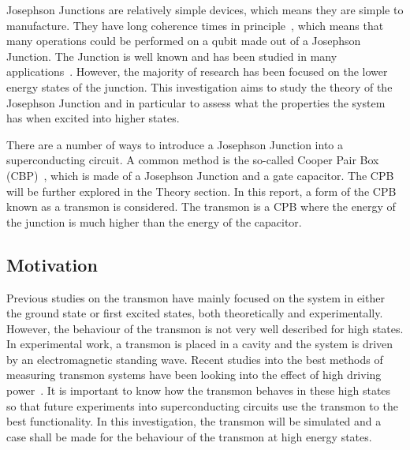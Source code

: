 \documentclass[11pt]{article}
\begin{document}
Josephson Junctions are relatively simple devices, which means they are simple to manufacture. They have long coherence times in principle~\cite{paikObservationHighCoherence2011}, which means that many operations could be performed on a qubit made out of a Josephson Junction. The Junction is well known and has been studied in many applications~\cite{yuCoherentTemporalOscillations2002,simmondsDecoherenceJosephsonPhase2004}. However, the majority of research has been focused on the lower energy states of the junction. This investigation aims to study the theory of the Josephson Junction and in particular to assess what the properties the system has when excited into higher states.

There are a number of ways to introduce a Josephson Junction into a superconducting circuit. A common method is the so-called Cooper Pair Box (CBP)~\cite{bladhSingleCooperpairBox2005}, which is made of a Josephson Junction and a gate capacitor. The CPB will be further explored in the Theory section. In this report, a form of the CPB known as a transmon is considered. The transmon is a CPB where the energy of the junction is much higher than the energy of the capacitor.

\subsection{Motivation}
Previous studies on the transmon have mainly focused on the system in either the ground state or first excited states, both theoretically and experimentally. However, the behaviour of the transmon is not very well described for high states. In experimental work, a transmon is placed in a cavity and the system is driven by an electromagnetic standing wave. Recent studies into the best methods of measuring transmon systems have been looking into the effect of high driving power~\cite{reedHighFidelityReadoutCircuit2010}. It is important to know how the transmon behaves in these high states so that future experiments into superconducting circuits use the transmon to the best functionality. In this investigation, the transmon will be simulated and a case shall be made for the behaviour of the transmon at high energy states.
\end{document}
